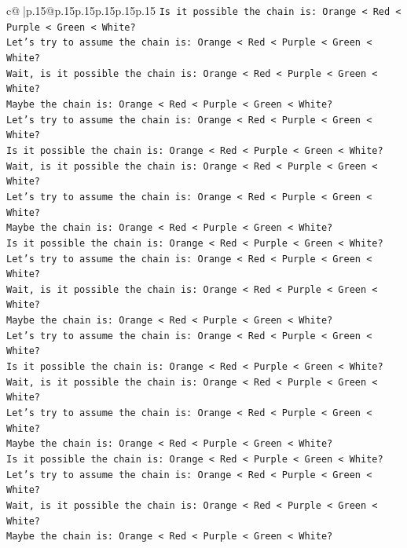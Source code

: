 \documentclass{article}
\begin{document}
{\begin{supertabular}{c@{$\;$}|p{.15\linewidth}@{}p{.15\linewidth}p{.15\linewidth}p{.15\linewidth}p{.15\linewidth}p{.15\linewidth}}
{{{\texttt{Is it possible the chain is: Orange < Red < Purple < Green < White?} \\
\texttt{Let's try to assume the chain is: Orange < Red < Purple < Green < White?} \\
\texttt{Wait, is it possible the chain is: Orange < Red < Purple < Green < White?} \\
\texttt{Maybe the chain is: Orange < Red < Purple < Green < White?} \\
\texttt{Let's try to assume the chain is: Orange < Red < Purple < Green < White?} \\
\texttt{Is it possible the chain is: Orange < Red < Purple < Green < White?} \\
\texttt{Wait, is it possible the chain is: Orange < Red < Purple < Green < White?} \\
\texttt{Let's try to assume the chain is: Orange < Red < Purple < Green < White?} \\
\texttt{Maybe the chain is: Orange < Red < Purple < Green < White?} \\
\texttt{Is it possible the chain is: Orange < Red < Purple < Green < White?} \\
\texttt{Let's try to assume the chain is: Orange < Red < Purple < Green < White?} \\
\texttt{Wait, is it possible the chain is: Orange < Red < Purple < Green < White?} \\
\texttt{Maybe the chain is: Orange < Red < Purple < Green < White?} \\
\texttt{Let's try to assume the chain is: Orange < Red < Purple < Green < White?} \\
\texttt{Is it possible the chain is: Orange < Red < Purple < Green < White?} \\
\texttt{Wait, is it possible the chain is: Orange < Red < Purple < Green < White?} \\
\texttt{Let's try to assume the chain is: Orange < Red < Purple < Green < White?} \\
\texttt{Maybe the chain is: Orange < Red < Purple < Green < White?} \\
\texttt{Is it possible the chain is: Orange < Red < Purple < Green < White?} \\
\texttt{Let's try to assume the chain is: Orange < Red < Purple < Green < White?} \\
\texttt{Wait, is it possible the chain is: Orange < Red < Purple < Green < White?} \\
\texttt{Maybe the chain is: Orange < Red < Purple < Green < White?} \\
}}}
\end{supertabular}}
\end{document}
